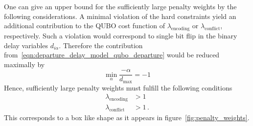One can give an upper bound for the sufficiently large penalty weights by the following considerations.
A minimal violation of the hard constraints yield an additional contribution to the QUBO cost function of $\lambda_\text{encoding}$ or $\lambda_\text{conflict}$, respectively.
Such a violation would correspond to single bit flip in the binary delay variables $d_{i\alpha}$.
Therefore the contribution from~\eqref{eqn:departure_delay_model_qubo_departure} would be reduced maximally by 
\begin{equation*}
    \min_\alpha \frac{-\alpha}{d_\text{max}} = - 1    
\end{equation*}
Hence, sufficiently large penalty weights must fulfill the following conditions
\begin{align*}
    \lambda_\text{encoding} & > 1 \\
    \lambda_\text{conflict} &> 1 \, .
\end{align*}
This corresponds to a box like shape as it appears in figure~\ref{fig:penalty_weights}.
